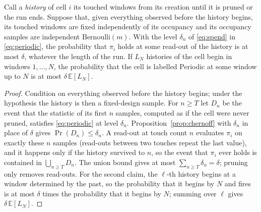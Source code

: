 \begin{proposition}\label{prop:spend}
Call a \emph{history} of cell $i$ its touched windows from its creation until it is pruned or the run ends. Suppose that, given everything observed before the history begins, its touched windows are fixed independently of its occupancy and its occupancy samples are independent $\mathrm{Bernoulli}(m)$. With the level $\delta_n$ of \eqref{eq:spend} in \eqref{eq:periodic}, the probability that $\pi_i$ holds at some read-out of the history is at most $\delta$, whatever the length of the run. If $L_N$ histories of the cell begin in windows $1,\dots,N$, the probability that the cell is labelled Periodic at some window up to $N$ is at most $\delta\,\mathbb{E}[L_N]$.
\end{proposition}
\begin{proof}
Condition on everything observed before the history begins; under the hypothesis the history is then a fixed-design sample. For $n\ge T$ let $D_n$ be the event that the statistic of its first $n$ samples, computed as if the cell were never pruned, satisfies \eqref{eq:periodic} at level $\delta_n$. Proposition~\ref{prop:chernoff} with $\delta_n$ in place of $\delta$ gives $\Pr(D_n)\le\delta_n$. A read-out at touch count $n$ evaluates $\pi_i$ on exactly these $n$ samples (read-outs between two touches repeat the last value), and it happens only if the history survived to $n$, so the event that $\pi_i$ ever holds is contained in $\bigcup_{n\ge T}D_n$. The union bound gives at most $\sum_{n\ge T}\delta_n=\delta$; pruning only removes read-outs. For the second claim, the $\ell$-th history begins at a window determined by the past, so the probability that it begins by $N$ and fires is at most $\delta$ times the probability that it begins by $N$; summing over $\ell$ gives $\delta\,\mathbb{E}[L_N]$.
\end{proof}
